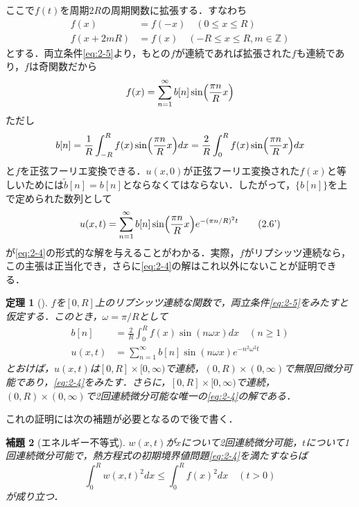 \documentclass[dvipdfmx,a4j,10pt]{jsarticle}
\makeatletter
\theoremstyle{mystyle1}
\newtheorem{theorem}{定理}[section]
\newtheorem{lemma}[theorem]{補題}
\theoremstyle{mystyle3}
\theoremstyle{mystyle4}
\theoremstyle{mystyle6}
\theoremstyle{mystyle2}
\theoremstyle{mystyle5}
\renewenvironment{proof}[1][\proofname]{\par
  \pushQED{\qed}%
  \normalfont
  \topsep6\p@\@plus6\p@ \trivlist
  \item[\hskip\labelsep{\bfseries\sffamily #1}]\ignorespaces
}{%
  \popQED\endtrivlist\@endpefalse
}
\renewcommand\proofname{証明}
\newenvironment{lem}[1][]
{\begin{tcolorbox}[
    enhanced,
    boxrule=0pt,
    arc=0mm,
    frame hidden,
    borderline west={2pt}{-4pt}{yellow!90!black},
    breakable = true
    ]
    \begin{lemma}[#1]
}
{\end{lemma}\end{tcolorbox}}
\newenvironment{thm}[1][]
{\begin{tcolorbox}[
    enhanced,
    boxrule=0pt,
    arc=0mm,
    frame hidden,
    borderline west={2pt}{-4pt}{red},
    breakable = true
    ]
    \begin{theorem}[#1]
}
{\end{theorem}\end{tcolorbox}}
\makeatother
\begin{document}
ここで$f(t)$を周期$2R$の周期関数に拡張する．すなわち
\[
	\begin{split}
		f(x)     & =f(-x)\quad(0\leq x\leq R)                 \\
		f(x+2mR) & =f(x)\quad (-R\leq x\leq R,m\in\mathbb{Z})
	\end{split}
\]
とする．両立条件\eqref{eq:2-5}より，もとの$f$が連続であれば拡張された$f$も連続であり，$f$は奇関数だから
\[
	f(x)=\sum_{n=1}^\infty b[n]\sin\mleft(\frac{\pi n}{R}x\mright)
\]
ただし
\[
	b[n]=\frac{1}{R}\int_{-R}^R f(x)\sin\mleft(\frac{\pi n}{R}x\mright) dx=\frac{2}{R}\int_0^R f(x)\sin\mleft(\frac{\pi n}{R}x\mright) dx
\]
と$f$を正弦フーリエ変換できる．$u(x,0)$が正弦フーリエ変換された$f(x)$と等しいためには$\tilde b[n]=b[n]$とならなくてはならない．したがって，$\{b[n]\}$を上で定められた数列として
\begin{equation}\label{eq:2-6'}
	u(x,t)=\sum_{n=1}^\infty b[n]\sin\mleft(\frac{\pi n}{R}x\mright)e^{-(\pi n/R)^2 t}\tag{2.6'}
\end{equation}
が\eqref{eq:2-4}の形式的な解を与えることがわかる．実際，$f$がリプシッツ連続なら，この主張は正当化でき，さらに\eqref{eq:2-4}の解はこれ以外にないことが証明できる．

\begin{thm}\label{thm:2-6}
	$f$を$[0,R]$上のリプシッツ連続な関数で，両立条件\eqref{eq:2-5}をみたすと仮定する．このとき，$\omega=\pi/R$として
	\[
		\begin{split}
			b[n]&=\frac{2}{R}\int_0^R f(x)\sin(n\omega x)dx\quad(n\geq 1) \\
			u(x,t)&=\sum_{n=1}^\infty b[n]\sin(n\omega x)e^{-n^2\omega^2 t}
		\end{split}
	\]
	とおけば，$u(x,t)$は$[0,R]\times [0,\infty)$で連続，$(0,R)\times(0,\infty)$で無限回微分可能であり，\eqref{eq:2-4}をみたす．さらに，$[0,R]\times [0,\infty)$で連続，$(0,R)\times(0,\infty)$で2回連続微分可能な唯一の\eqref{eq:2-4}の解である．
\end{thm}

\begin{proof}
	これの証明には次の補題が必要となるので後で書く．
\end{proof}

\begin{lem}[エネルギー不等式]\label{lem:2-7}
	$w(x,t)$が$x$について2回連続微分可能，$t$について1回連続微分可能で，熱方程式の初期境界値問題\eqref{eq:2-4}を満たすならば
	\begin{equation}\label{eq:2-8}
		\int_0^R w(x,t)^2 dx\leq \int_0^R f(x)^2 dx\quad(t>0)
	\end{equation}
	が成り立つ．
\end{lem}
\end{document}
